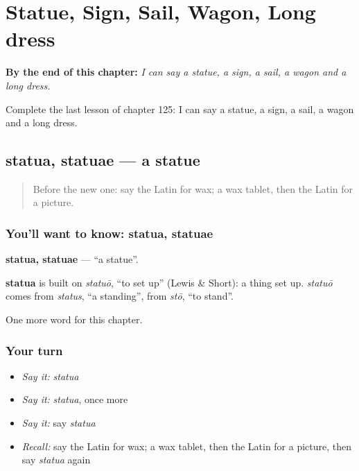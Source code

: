 
\chapter{Statue, Sign, Sail, Wagon, Long dress}
\label{ch:la-statue-sign-sail-wagon-long-dress}

\begin{chapteropening}
\textbf{By the end of this chapter:} \emph{I can say a statue, a sign, a sail, a wagon and a long dress.}

Complete the last lesson of chapter 125: I can say a statue, a sign, a sail, a wagon and a long dress.
\end{chapteropening}

\section[statua, statuae]{statua, statuae — a statue}

\label{lesson:LA-C125-statua}



\begin{quote}
Before the new one: say the Latin for wax; a wax tablet, then the Latin for a picture.
\end{quote}

\subsection*{You'll want to know: statua, statuae}
\textbf{statua, statuae} — \textquotedblleft{}a statue\textquotedblright{}.

\begin{cousinweb}
\textbf{statua} is built on \emph{statuō}, \textquotedblleft{}to set up\textquotedblright{} (Lewis \& Short): a thing set up. \emph{statuō} comes from \emph{status}, \textquotedblleft{}a standing\textquotedblright{}, from \emph{stō}, \textquotedblleft{}to stand\textquotedblright{}.
\end{cousinweb}

\begin{grammarlens}[title={What you've built}]
One more word for this chapter.
\end{grammarlens}

\subsection*{Your turn}
\begin{itemize}
\raggedright
  \item \emph{Say it:} \emph{statua}
  \item \emph{Say it:} \emph{statua}, once more
  \item \emph{Say it:} say \emph{statua}
  \item \emph{Recall:} say the Latin for wax; a wax tablet, then the Latin for a picture, then say \emph{statua} again
\end{itemize}

